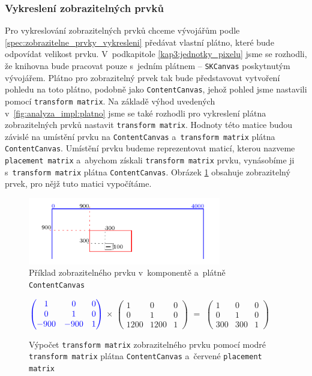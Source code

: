 \subsubsection*{Vykreslení zobrazitelných prvků}
\label{kap3:vykresleni_zobrazitelnych_prvku}
Pro vykreslování zobrazitelných prvků chceme vývojářům podle \ref{spec:zobrazitelne_prvky_vykresleni} předávat vlastní plátno, které bude odpovídat velikost prvku. V~podkapitole \ref{kap3:jednotky_pixelu} jsme se rozhodli, že knihovna bude pracovat pouze s~jedním plátnem -- \texttt{SKCanvas} poskytnutým vývojářem. Plátno pro zobrazitelný prvek tak bude představovat vytvoření pohledu na toto plátno, podobně jako \texttt{ContentCanvas}, jehož pohled jsme nastavili pomocí \texttt{transform matrix}. Na základě výhod uvedených v~\ref{fig:analyza_impl:platno} jsme se také rozhodli pro vykreslení plátna zobrazitelných prvků nastavit \texttt{transform matrix}. Hodnoty této matice budou závislé na umístění prvku na \texttt{ContentCanvas} a~\texttt{transform matrix} plátna \texttt{ContentCanvas}. Umístění prvku budeme reprezentovat maticí, kterou nazveme \texttt{placement matrix} a~abychom získali \texttt{transform matrix} prvku, vynásobíme ji s~\texttt{transform matrix} plátna \texttt{ContentCanvas}. Obrázek \ref{fig:matice_umisteni1} obsahuje zobrazitelný prvek, pro nějž tuto matici vypočítáme.
\begin{figure}[!bht]
	\centering
	\includegraphics[width=0.75\textwidth]{../img/kap3_matice_umisteni.pdf}
	\caption{Příklad zobrazitelného prvku v~komponentě a~plátně \texttt{ContentCanvas}}
	\label{fig:matice_umisteni1}
\end{figure}
\begin{figure}[!bht]

\centering 
$\color{blue}
\begin{pmatrix} 
1 & 0 & 0 \\
0 & 1 & 0 \\
-900 & -900 & 1
\end{pmatrix}$
\color{black}
$\times$
\color{red} 
$\begin{pmatrix} 
1 & 0 & 0 \\
0 & 1 & 0 \\
1200 & 1200 & 1
\end{pmatrix}$
\color{black}
$=$
$\begin{pmatrix} 
1 & 0 & 0 \\
0 & 1 & 0 \\
300 & 300 & 1
\end{pmatrix}$
\caption{Výpočet \texttt{transform matrix} zobrazitelného prvku pomocí modré \texttt{transform matrix} plátna \texttt{ContentCanvas} a~červené \texttt{placement matrix}}
\end{figure}
